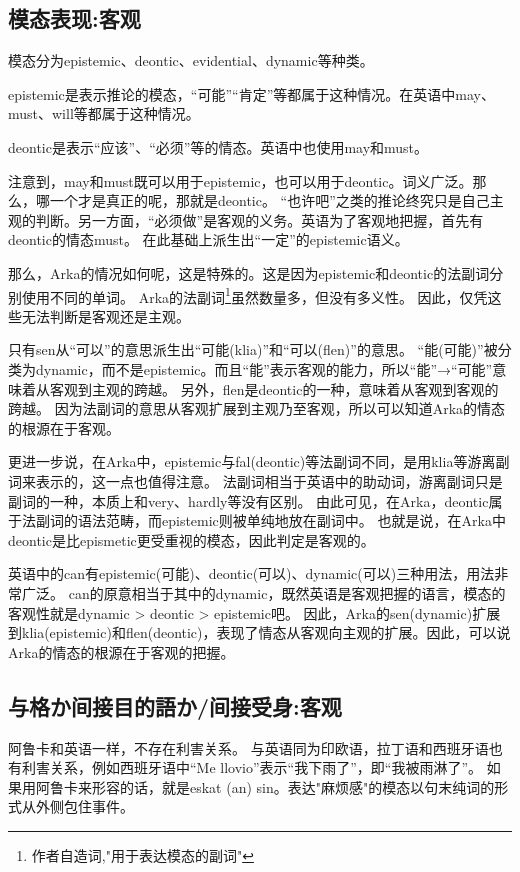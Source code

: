 \subsection{模态表现:客观}

模态分为epistemic、deontic、evidential、dynamic等种类。

epistemic是表示推论的模态，“可能”“肯定”等都属于这种情况。在英语中may、must、will等都属于这种情况。

deontic是表示“应该”、“必须”等的情态。英语中也使用may和must。

注意到，may和must既可以用于epistemic，也可以用于deontic。词义广泛。那么，哪一个才是真正的呢，那就是deontic。
“也许吧”之类的推论终究只是自己主观的判断。另一方面，“必须做”是客观的义务。英语为了客观地把握，首先有deontic的情态must。
在此基础上派生出“一定”的epistemic语义。

那么，Arka的情况如何呢，这是特殊的。这是因为epistemic和deontic的法副词分别使用不同的单词。
Arka的法副词\footnote{作者自造词,"用于表达模态的副词"}虽然数量多，但没有多义性。
因此，仅凭这些无法判断是客观还是主观。


只有sen从“可以”的意思派生出“可能(klia)”和“可以(flen)”的意思。
“能(可能)”被分类为dynamic，而不是epistemic。而且“能”表示客观的能力，所以“能”→“可能”意味着从客观到主观的跨越。
另外，flen是deontic的一种，意味着从客观到客观的跨越。
因为法副词的意思从客观扩展到主观乃至客观，所以可以知道Arka的情态的根源在于客观。

更进一步说，在Arka中，epistemic与fal(deontic)等法副词不同，是用klia等游离副词来表示的，这一点也值得注意。
法副词相当于英语中的助动词，游离副词只是副词的一种，本质上和very、hardly等没有区别。
由此可见，在Arka，deontic属于法副词的语法范畴，而epistemic则被单纯地放在副词中。
也就是说，在Arka中deontic是比epismetic更受重视的模态，因此判定是客观的。

英语中的can有epistemic(可能)、deontic(可以)、dynamic(可以)三种用法，用法非常广泛。
can的原意相当于其中的dynamic，既然英语是客观把握的语言，模态的客观性就是dynamic > deontic > epistemic吧。
因此，Arka的sen(dynamic)扩展到klia(epistemic)和flen(deontic)，表现了情态从客观向主观的扩展。因此，可以说Arka的情态的根源在于客观的把握。

\subsection{与格か间接目的語か/间接受身:客观}

阿鲁卡和英语一样，不存在利害关系。
与英语同为印欧语，拉丁语和西班牙语也有利害关系，例如西班牙语中“Me llovio”表示“我下雨了”，即“我被雨淋了”。
如果用阿鲁卡来形容的话，就是eskat (an) sin。表达"麻烦感"的模态以句末纯词的形式从外侧包住事件。

